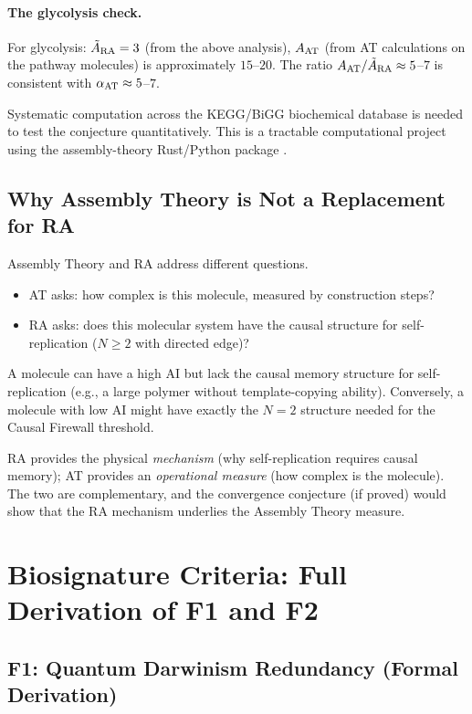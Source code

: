 \documentclass[12pt,a4paper]{article}
\begin{document}
\paragraph{The glycolysis check.}  For glycolysis: $\tilde{A}_{\rm RA}=3$ (from the above analysis), $A_{\rm AT}$ (from AT calculations on the pathway molecules) is approximately $15$--$20$.  The ratio $A_{\rm AT}/\tilde{A}_{\rm RA}\approx5$--$7$ is consistent with $\alpha_{\rm AT}\approx5$--$7$.

Systematic computation across the KEGG/BiGG biochemical database is needed to test the conjecture quantitatively.  This is a tractable computational project using the assembly-theory Rust/Python package \cite{AT_package2026}.

\subsection{Why Assembly Theory is Not a Replacement for RA}

Assembly Theory and RA address different questions.
\begin{itemize}
  \item AT asks: how complex is this molecule, measured by construction steps?
  \item RA asks: does this molecular system have the causal structure for self-replication ($N\geq2$ with directed edge)?
\end{itemize}
A molecule can have a high AI but lack the causal memory structure for self-replication (e.g., a large polymer without template-copying ability).  Conversely, a molecule with low AI might have exactly the $N=2$ structure needed for the Causal Firewall threshold.

RA provides the physical \emph{mechanism} (why self-replication requires causal memory); AT provides an \emph{operational measure} (how complex is the molecule).  The two are complementary, and the convergence conjecture (if proved) would show that the RA mechanism underlies the Assembly Theory measure.

\section{Biosignature Criteria: Full Derivation of F1 and F2}\label{sec:biosig_full}

\subsection{F1: Quantum Darwinism Redundancy (Formal Derivation)}
\end{document}
